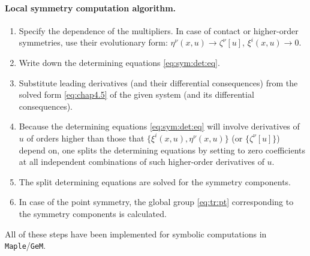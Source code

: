 \documentclass[alpha-refs, 12pt]{wiley-article}
\begin{document}
\paragraph{Local symmetry computation algorithm.}
\begin{enumerate}
  \item Specify the dependence of the multipliers. In case of contact or higher-order symmetries, use their evolutionary form: $\eta^{\nu}(x,u) \to \zeta^{\nu}[u]$, $\xi^{i}(x,u) \to 0$.
  \item Write down the determining equations \eqref{eq:sym:det:eq}.
  \item Substitute leading derivatives (and their differential consequences) from the solved form \eqref{eq:chap4.5} of the given system (and its differential consequences).
  \item Because the determining equations \eqref{eq:sym:det:eq} will involve derivatives of $u$ of orders higher than those that $\{\xi^{i}(x,u), \eta^{\nu}(x,u)\}$ (or $\{\zeta^{\nu}[u]\}$) depend on, one splits the determining equations by setting to zero coefficients at all independent combinations of such higher-order derivatives of $u$.
  \item The split determining equations are solved for the symmetry components.
  \item In case of the point symmetry, the global group \eqref{eq:tr:pt} corresponding to the symmetry components is calculated.
\end{enumerate}

All of these steps have been implemented for symbolic computations in \texttt{Maple}/\texttt{GeM}.

%
\end{document}
